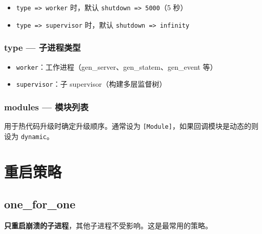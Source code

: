 \documentclass[a4paper,11pt]{article}
\begin{document}
\begin{notebox}[默认值]
\begin{itemize}[leftmargin=1.5em]
    \item \texttt{type => worker} 时，默认 \texttt{shutdown => 5000}（5 秒）
    \item \texttt{type => supervisor} 时，默认 \texttt{shutdown => infinity}
\end{itemize}
\end{notebox}

\subsubsection{type --- 子进程类型}

\begin{itemize}[leftmargin=2em]
    \item \texttt{worker}：工作进程（gen\_server、gen\_statem、gen\_event 等）
    \item \texttt{supervisor}：子 supervisor（构建多层监督树）
\end{itemize}

\subsubsection{modules --- 模块列表}

用于热代码升级时确定升级顺序。通常设为 \texttt{[Module]}，如果回调模块是动态的则设为 \texttt{dynamic}。


\section{重启策略}

\subsection{one\_for\_one}

\textbf{只重启崩溃的子进程}，其他子进程不受影响。这是最常用的策略。
\end{document}
